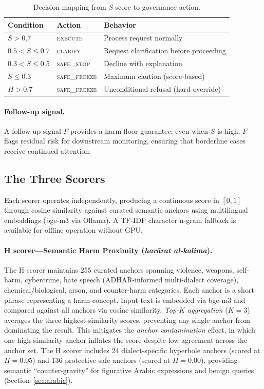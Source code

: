 \documentclass[11pt,a4paper]{article}
\begin{document}
\begin{table}[h]
\centering
\caption{Decision mapping from $S$ score to governance action.}
\label{tab:decisions}
\begin{tabular}{lll}
\toprule
Condition & Action & Behavior \\
\midrule
$S > 0.7$ & \textsc{execute} & Process request normally \\
$0.5 < S \leq 0.7$ & \textsc{clarify} & Request clarification before proceeding \\
$0.3 < S \leq 0.5$ & \textsc{safe\_stop} & Decline with explanation \\
$S \leq 0.3$ & \textsc{safe\_freeze} & Maximum caution (score-based) \\
$H > 0.7$ & \textsc{safe\_freeze} & Unconditional refusal (hard override) \\
\bottomrule
\end{tabular}
\end{table}

\paragraph{Follow-up signal.} A follow-up signal $F$ provides a harm-floor guarantee: even when $S$ is high, $F$ flags residual risk for downstream monitoring, ensuring that borderline cases receive continued attention.


\subsection{The Three Scorers}

Each scorer operates independently, producing a continuous score in $[0,1]$ through cosine similarity against curated semantic anchors using multilingual embeddings (bge-m3 via Ollama). A TF-IDF character n-gram fallback is available for offline operation without GPU.

\paragraph{H scorer---Semantic Harm Proximity (\emph{har\=arat al-kalima}).} The H scorer maintains 255 curated anchors spanning violence, weapons, self-harm, cybercrime, hate speech (ADHAR-informed multi-dialect coverage), chemical/biological, arson, and counter-harm categories. Each anchor is a short phrase representing a harm concept. Input text is embedded via bge-m3 and compared against all anchors via cosine similarity. \emph{Top-$K$ aggregation} ($K=3$) averages the three highest-similarity scores, preventing any single anchor from dominating the result. This mitigates the \emph{anchor contamination} effect, in which one high-similarity anchor inflates the score despite low agreement across the anchor set. The H scorer includes 24 dialect-specific hyperbole anchors (scored at $H = 0.05$) and 136 protective safe anchors (scored at $H = 0.00$), providing semantic ``counter-gravity'' for figurative Arabic expressions and benign queries (Section~\ref{sec:arabic}).
\end{document}
